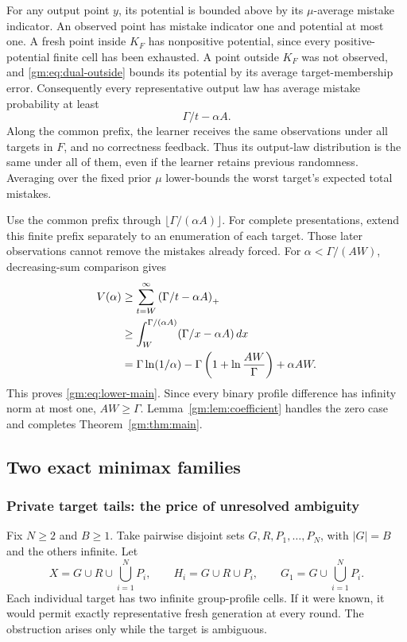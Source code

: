 For any output point $y$, its potential is bounded above by its $\mu$-average mistake indicator. An observed point has mistake indicator one and potential at most one. A fresh point inside $K_F$ has nonpositive potential, since every positive-potential finite cell has been exhausted. A point outside $K_F$ was not observed, and \eqref{gm:eq:dual-outside} bounds its potential by its average target-membership error. Consequently every representative output law has average mistake probability at least
\[
\Gamma/t-\alpha A.
\]
Along the common prefix, the learner receives the same observations under all targets in $F$, and no correctness feedback. Thus its output-law distribution is the same under all of them, even if the learner retains previous randomness. Averaging over the fixed prior $\mu$ lower-bounds the worst target's expected total mistakes.

Use the common prefix through $\lfloor\Gamma/(\alpha A)\rfloor$. For complete presentations, extend this finite prefix separately to an enumeration of each target. Those later observations cannot remove the mistakes already forced. For $\alpha<\Gamma/(AW)$, decreasing-sum comparison gives
\begin{align*}
V(\alpha)&\ge\sum_{t=W}^{\infty}\left(\Gamma/t-\alpha A\right)_+\\
&\ge\int_W^{\Gamma/(\alpha A)}(\Gamma/x-\alpha A)\,dx\\
&=\Gamma\ln(1/\alpha)-\Gamma\left(1+\ln\frac{AW}{\Gamma}\right)+\alpha AW.
\end{align*}
This proves \eqref{gm:eq:lower-main}. Since every binary profile difference has infinity norm at most one, $AW\ge\Gamma$. Lemma~\ref{gm:lem:coefficient} handles the zero case and completes Theorem~\ref{gm:thm:main}.

\subsection{Two exact minimax families}
\subsubsection{Private target tails: the price of unresolved ambiguity}
Fix $N\ge2$ and $B\ge1$. Take pairwise disjoint sets $G,R,P_1,\ldots,P_N$, with $|G|=B$ and the others infinite. Let
\[
X=G\cup R\cup\bigcup_{i=1}^NP_i,\qquad
H_i=G\cup R\cup P_i,
\qquad G_1=G\cup\bigcup_{i=1}^NP_i.
\]
Each individual target has two infinite group-profile cells. If it were known, it would permit exactly representative fresh generation at every round. The obstruction arises only while the target is ambiguous.

